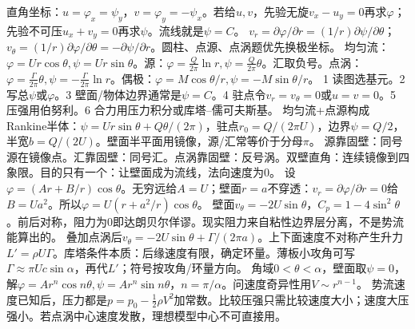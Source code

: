 直角坐标：$u=\varphi_x=\psi_y$，$v=\varphi_y=-\psi_x$。若给$u,v$，先验无旋$v_x-u_y=0$再求$\varphi$；先验不可压$u_x+v_y=0$再求$\psi$。流线就是$\psi=C$。
$v_r=\partial\varphi/\partial r=(1/r)\partial\psi/\partial\theta$；$v_\theta=(1/r)\partial\varphi/\partial\theta=-\partial\psi/\partial r$。圆柱、点源、点涡题优先换极坐标。
均匀流：$\varphi=Ur\cos\theta,\psi=Ur\sin\theta$。源：$\varphi=\frac Q{2\pi}\ln r,\psi=\frac Q{2\pi}\theta$。汇取负号。点涡：$\varphi=\frac\Gamma{2\pi}\theta,\psi=-\frac\Gamma{2\pi}\ln r$。偶极：$\varphi=M\cos\theta/r,\psi=-M\sin\theta/r$。
1 读图选基元。2 写总$\psi$或$\varphi$。3 壁面/物体边界通常是$\psi=C$。4 驻点令$v_r=v_\theta=0$或$u=v=0$。5 压强用伯努利。6 合力用压力积分或库塔--儒可夫斯基。
均匀流+点源构成Rankine半体：$\psi=Ur\sin\theta+Q\theta/(2\pi)$，驻点$r_0=Q/(2\pi U)$，边界$\psi=Q/2$，半宽$b=Q/(2U)$。壁面半平面用镜像，源/汇常等价于分母$\pi$。
源靠固壁：同号源在镜像点。汇靠固壁：同号汇。点涡靠固壁：反号涡。双壁直角：连续镜像到四象限。目的只有一个：让壁面成为流线，法向速度为0。
设$\varphi=(Ar+B/r)\cos\theta$。无穷远给$A=U$；壁面$r=a$不穿透：$v_r=\partial\varphi/\partial r=0$给$B=Ua^2$。所以$\varphi=U(r+a^2/r)\cos\theta$。
壁面$v_\theta=-2U\sin\theta$，$C_p=1-4\sin^2\theta$。前后对称，阻力为0即达朗贝尔佯谬。现实阻力来自粘性边界层分离，不是势流能算出的。
叠加点涡后$v_\theta=-2U\sin\theta+\Gamma/(2\pi a)$。上下面速度不对称产生升力$L'=\rho U\Gamma$。库塔条件本质：后缘速度有限，确定环量。薄板小攻角可写$\Gamma\approx\pi Uc\sin\alpha$，再代$L'$；符号按攻角/环量方向。
角域$0<\theta<\alpha$，壁面取$\psi=0$，解$\varphi=Ar^n\cos n\theta,\psi=Ar^n\sin n\theta$，$n=\pi/\alpha$。问速度奇异性用$V\sim r^{n-1}$。
势流速度已知后，压力都是$p=p_0-\frac12\rho V^2$加常数。比较压强只需比较速度大小；速度大压强小。若点涡中心速度发散，理想模型中心不可直接用。

